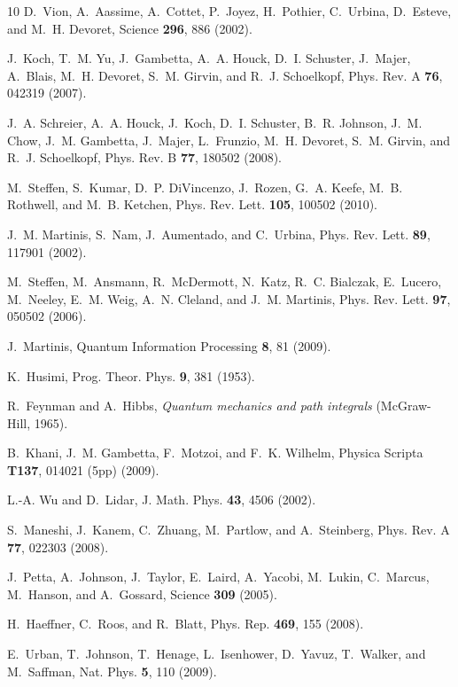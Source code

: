 \documentclass[pra,twocolumn,floatfix,superscriptaddress,eqsecnum]{revtex4-1}
\begin{document}
\begin{thebibliography}{10}
D.~Vion, A.~Aassime, A.~Cottet, P.~Joyez, H.~Pothier, C.~Urbina, D.~Esteve, and
  M.~H. Devoret, Science \textbf{296}, 886 (2002).

J.~Koch, T.~M. Yu, J.~Gambetta, A.~A. Houck, D.~I. Schuster, J.~Majer,
  A.~Blais, M.~H. Devoret, S.~M. Girvin, and R.~J. Schoelkopf, Phys. Rev. A
  \textbf{76}, 042319 (2007).

J.~A. Schreier, A.~A. Houck, J.~Koch, D.~I. Schuster, B.~R. Johnson, J.~M.
  Chow, J.~M. Gambetta, J.~Majer, L.~Frunzio, M.~H. Devoret, S.~M. Girvin, and
  R.~J. Schoelkopf, Phys. Rev. B \textbf{77}, 180502 (2008).

M.~Steffen, S.~Kumar, D.~P. DiVincenzo, J.~Rozen, G.~A. Keefe, M.~B. Rothwell,
  and M.~B. Ketchen, Phys. Rev. Lett. \textbf{105}, 100502 (2010).

J.~M. Martinis, S.~Nam, J.~Aumentado, and C.~Urbina, Phys. Rev. Lett.
  \textbf{89}, 117901 (2002).

M.~Steffen, M.~Ansmann, R.~McDermott, N.~Katz, R.~C. Bialczak, E.~Lucero,
  M.~Neeley, E.~M. Weig, A.~N. Cleland, and J.~M. Martinis, Phys. Rev. Lett.
  \textbf{97}, 050502 (2006).

J.~Martinis, Quantum Information Processing \textbf{8}, 81 (2009).

K.~Husimi, Prog. Theor. Phys. \textbf{9}, 381 (1953).

R.~Feynman and A.~Hibbs, \emph{Quantum mechanics and path integrals}
  (McGraw-Hill, 1965).

B.~Khani, J.~M. Gambetta, F.~Motzoi, and F.~K. Wilhelm, Physica Scripta
  \textbf{T137}, 014021 (5pp) (2009).

L.-A. Wu and D.~Lidar, J. Math. Phys. \textbf{43}, 4506 (2002).

S.~Maneshi, J.~Kanem, C.~Zhuang, M.~Partlow, and A.~Steinberg, Phys. Rev. A
  \textbf{77}, 022303 (2008).

J.~Petta, A.~Johnson, J.~Taylor, E.~Laird, A.~Yacobi, M.~Lukin, C.~Marcus,
  M.~Hanson, and A.~Gossard, Science \textbf{309} (2005).

H.~Haeffner, C.~Roos, and R.~Blatt, Phys. Rep. \textbf{469}, 155 (2008).

E.~Urban, T.~Johnson, T.~Henage, L.~Isenhower, D.~Yavuz, T.~Walker, and
  M.~Saffman, Nat. Phys. \textbf{5}, 110 (2009).


\end{thebibliography}
\end{document}
